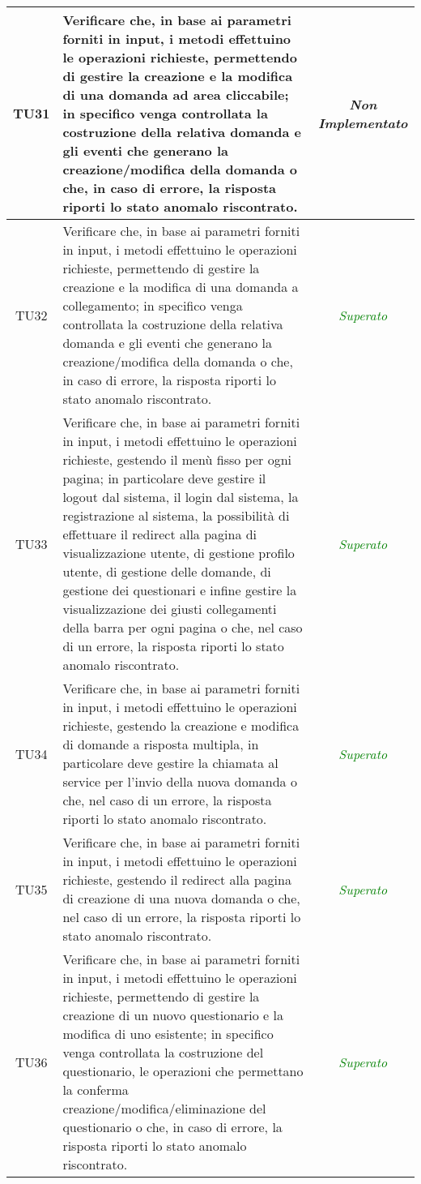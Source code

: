 \begin{longtable}{|c|>{}m{10cm}|c|}
\hypertarget{TU31}{TU31} & Verificare che, in base ai parametri forniti in input, i metodi effettuino le operazioni richieste, permettendo di gestire la creazione e la modifica di una domanda ad area cliccabile; in specifico venga controllata la costruzione della relativa domanda e gli eventi che generano la creazione/modifica della domanda  o che, in caso di errore, la risposta riporti lo stato anomalo riscontrato. & \textit{Non Implementato}\\ \hline
\hypertarget{TU32}{TU32} & Verificare che, in base ai parametri forniti in input, i metodi effettuino le operazioni richieste, permettendo di gestire la creazione e la modifica di una domanda a collegamento; in specifico venga controllata la costruzione della relativa domanda e gli eventi che generano la creazione/modifica della domanda o che, in caso di errore, la risposta riporti lo stato anomalo riscontrato. & \textcolor{Green}{\textit{Superato}}\\ \hline
\hypertarget{TU33}{TU33} & Verificare che, in base ai parametri forniti in input, i metodi effettuino le operazioni richieste, gestendo il menù fisso per ogni pagina; in particolare deve gestire il logout dal sistema, il login dal sistema, la registrazione al sistema, la possibilità di effettuare il redirect alla pagina di visualizzazione utente, di gestione profilo utente, di gestione delle domande, di gestione dei questionari e infine gestire la visualizzazione dei giusti collegamenti della barra per ogni pagina o che, nel caso di un errore, la risposta riporti lo stato anomalo riscontrato. & \textcolor{Green}{\textit{Superato}}\\ \hline
\hypertarget{TU34}{TU34} & Verificare che, in base ai parametri forniti in input, i metodi effettuino le operazioni richieste, gestendo la creazione e modifica di domande a risposta multipla, in particolare deve gestire la chiamata al service per l'invio della nuova domanda o che, nel caso di un errore, la risposta riporti lo stato anomalo riscontrato. & \textcolor{Green}{\textit{Superato}}\\ \hline
\hypertarget{TU35}{TU35} & Verificare che, in base ai parametri forniti in input, i metodi effettuino le operazioni richieste, gestendo il redirect alla pagina di creazione di una nuova domanda o che, nel caso di un errore, la risposta riporti lo stato anomalo riscontrato. & \textcolor{Green}{\textit{Superato}}\\ \hline
\hypertarget{TU36}{TU36} & Verificare che, in base ai parametri forniti in input, i metodi effettuino le operazioni richieste, permettendo di gestire la creazione di un nuovo questionario e la modifica di uno esistente; in specifico venga controllata la costruzione del questionario, le operazioni che permettano la conferma creazione/modifica/eliminazione del questionario o che, in caso di errore, la risposta riporti lo stato anomalo riscontrato. & \textcolor{Green}{\textit{Superato}}\\ \hline

\end{longtable}
